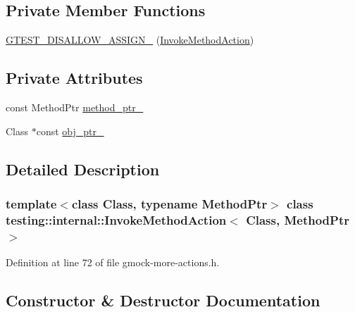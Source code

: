 \subsection*{Private Member Functions}
\begin{DoxyCompactItemize}
\item 
\hyperlink{classtesting_1_1internal_1_1InvokeMethodAction_ade6d5b1ee276aedac65290465a447a87}{G\+T\+E\+S\+T\+\_\+\+D\+I\+S\+A\+L\+L\+O\+W\+\_\+\+A\+S\+S\+I\+G\+N\+\_\+} (\hyperlink{classtesting_1_1internal_1_1InvokeMethodAction}{Invoke\+Method\+Action})
\end{DoxyCompactItemize}
\subsection*{Private Attributes}
\begin{DoxyCompactItemize}
\item 
const Method\+Ptr \hyperlink{classtesting_1_1internal_1_1InvokeMethodAction_ad87861bde8960e57a429b3cf5ba70133}{method\+\_\+ptr\+\_\+}
\item 
Class $\ast$const \hyperlink{classtesting_1_1internal_1_1InvokeMethodAction_ac857e8bad8f6417640145ab1f5740963}{obj\+\_\+ptr\+\_\+}
\end{DoxyCompactItemize}


\subsection{Detailed Description}
\subsubsection*{template$<$class Class, typename Method\+Ptr$>$\newline
class testing\+::internal\+::\+Invoke\+Method\+Action$<$ Class, Method\+Ptr $>$}



Definition at line 72 of file gmock-\/more-\/actions.\+h.



\subsection{Constructor \& Destructor Documentation}
\mbox{\label{classtesting_1_1internal_1_1InvokeMethodAction_a16e545f6166e2d54eeafdc2ab3adf06b}} 
